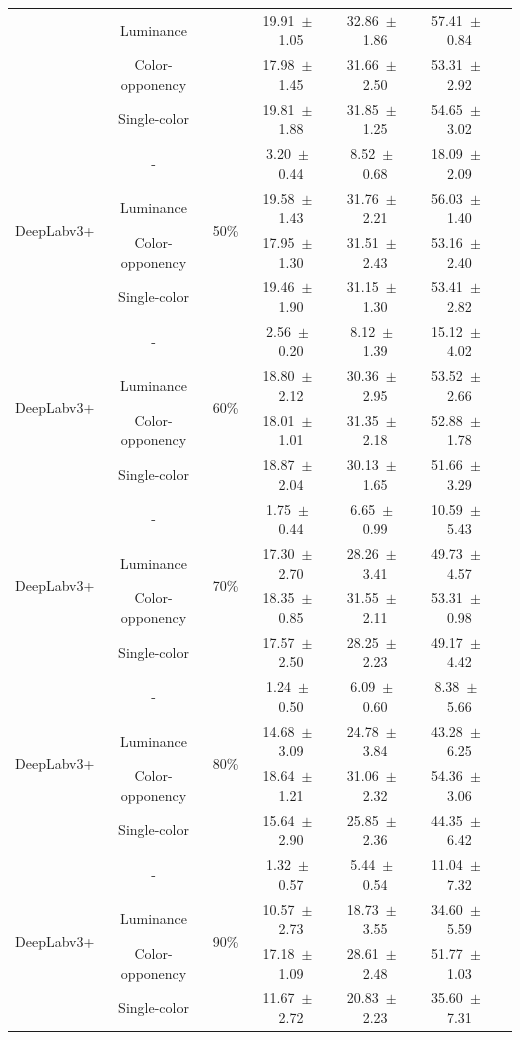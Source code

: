 \begin{table}[h]
\begin{tabular}{@{}lccc ccc@{}}
& Luminance & & 19.91~$\pm$~1.05 & 32.86~$\pm$~1.86 & 57.41~$\pm$~0.84 \\
& Color-opponency & & 17.98~$\pm$~1.45 & 31.66~$\pm$~2.50 & 53.31~$\pm$~2.92 \\
& Single-color & & 19.81~$\pm$~1.88 & 31.85~$\pm$~1.25 & 54.65~$\pm$~3.02 \\
\midrule
\multirow{4}{*}{DeepLabv3+} & - & \multirow{4}{*}{50\%} & 3.20~$\pm$~0.44 & 8.52~$\pm$~0.68 & 18.09~$\pm$~2.09 \\
& Luminance & & 19.58~$\pm$~1.43 & 31.76~$\pm$~2.21 & 56.03~$\pm$~1.40 \\
& Color-opponency & & 17.95~$\pm$~1.30 & 31.51~$\pm$~2.43 & 53.16~$\pm$~2.40 \\
& Single-color & & 19.46~$\pm$~1.90 & 31.15~$\pm$~1.30 & 53.41~$\pm$~2.82 \\
\midrule
\multirow{4}{*}{DeepLabv3+} & - & \multirow{4}{*}{60\%} & 2.56~$\pm$~0.20 & 8.12~$\pm$~1.39 & 15.12~$\pm$~4.02 \\
& Luminance & & 18.80~$\pm$~2.12 & 30.36~$\pm$~2.95 & 53.52~$\pm$~2.66 \\
& Color-opponency & & 18.01~$\pm$~1.01 & 31.35~$\pm$~2.18 & 52.88~$\pm$~1.78 \\
& Single-color & & 18.87~$\pm$~2.04 & 30.13~$\pm$~1.65 & 51.66~$\pm$~3.29 \\
\midrule
\multirow{4}{*}{DeepLabv3+} & - & \multirow{4}{*}{70\%} & 1.75~$\pm$~0.44 & 6.65~$\pm$~0.99 & 10.59~$\pm$~5.43 \\
& Luminance & & 17.30~$\pm$~2.70 & 28.26~$\pm$~3.41 & 49.73~$\pm$~4.57 \\
& Color-opponency & & 18.35~$\pm$~0.85 & 31.55~$\pm$~2.11 & 53.31~$\pm$~0.98 \\
& Single-color & & 17.57~$\pm$~2.50 & 28.25~$\pm$~2.23 & 49.17~$\pm$~4.42 \\
\midrule
\multirow{4}{*}{DeepLabv3+} & - & \multirow{4}{*}{80\%} & 1.24~$\pm$~0.50 & 6.09~$\pm$~0.60 & 8.38~$\pm$~5.66 \\
& Luminance & & 14.68~$\pm$~3.09 & 24.78~$\pm$~3.84 & 43.28~$\pm$~6.25 \\
& Color-opponency & & 18.64~$\pm$~1.21 & 31.06~$\pm$~2.32 & 54.36~$\pm$~3.06 \\
& Single-color & & 15.64~$\pm$~2.90 & 25.85~$\pm$~2.36 & 44.35~$\pm$~6.42 \\
\midrule
\multirow{4}{*}{DeepLabv3+} & - & \multirow{4}{*}{90\%} & 1.32~$\pm$~0.57 & 5.44~$\pm$~0.54 & 11.04~$\pm$~7.32 \\
& Luminance & & 10.57~$\pm$~2.73 & 18.73~$\pm$~3.55 & 34.60~$\pm$~5.59 \\
& Color-opponency & & 17.18~$\pm$~1.09 & 28.61~$\pm$~2.48 & 51.77~$\pm$~1.03 \\
& Single-color & & 11.67~$\pm$~2.72 & 20.83~$\pm$~2.23 & 35.60~$\pm$~7.31 \\
\midrule
\bottomrule
\end{tabular}
\label{tab:sparse_results_deeplabv3plus_acdc_night}
\end{table}